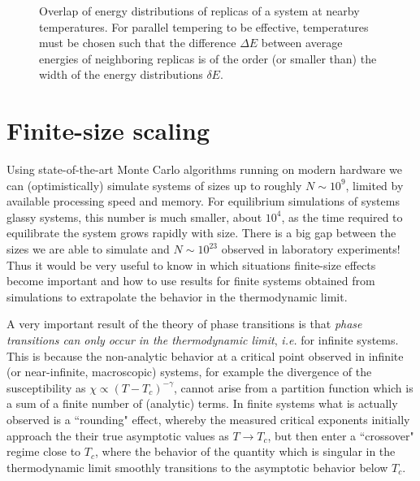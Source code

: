 

\begin{figure}
  \centering
  \begingroup
    \pgfplotsset{width=0.8\textwidth, height=0.3\textwidth}
    
  \endgroup
  \caption[
    Overlap of energy distributions of replicas of a system at nearby
    temperatures.
  ]
  {
    Overlap of energy distributions of replicas of a system at nearby
    temperatures. For parallel tempering to be effective, temperatures must
    be chosen such that the difference $\Delta E$ between average energies
    of neighboring replicas is of the order (or smaller than) the width
    of the energy distributions $\delta E$.
  }
  \label{fig:pt-energydist}
\end{figure}


\section{Finite-size scaling}
\label{sec:numerical-fss}

Using state-of-the-art Monte Carlo algorithms running on modern hardware we can
(optimistically) simulate systems of sizes up to roughly $N \sim 10^9$, limited
by available processing speed and memory. For equilibrium simulations of
systems glassy systems, this number is much smaller, about $10^4$, as the time
required to equilibrate the system grows rapidly with size. There is a big gap
between the sizes we are able to simulate and $N \sim 10^{23}$ observed in
laboratory experiments! Thus it would be very useful to know in which
situations finite-size effects become important and how to use results for
finite systems obtained from simulations to extrapolate the behavior in the
thermodynamic limit.

A very important result of the theory of phase transitions is that \emph{phase
  transitions can only occur in the thermodynamic limit}, \textit{i.e.} for
infinite systems. This is because the non-analytic behavior at a critical point
observed in infinite (or near-infinite, macroscopic) systems, for example the
divergence of the susceptibility as $\chi \propto (T-T_c)^{-\gamma}$, cannot
arise from a partition function which is a sum of a finite number of (analytic)
terms. In finite systems what is actually observed is a ``rounding" effect,
whereby the measured critical exponents initially approach the their true
asymptotic values as $T \to T_c$, but then enter a ``crossover" regime close to
$T_c$, where the behavior of the quantity which is singular in the
thermodynamic limit smoothly transitions to the asymptotic behavior below
$T_c$.

